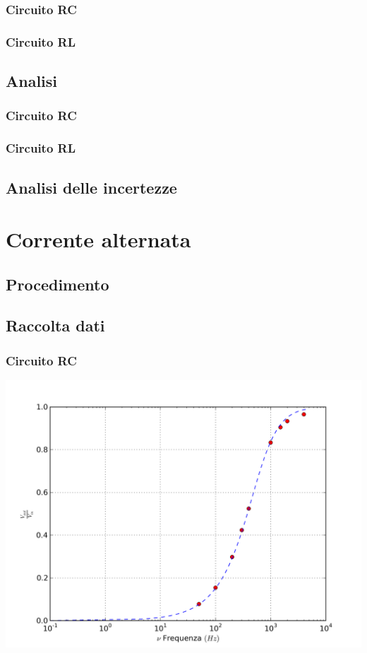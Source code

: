 \subsubsection{Circuito RC}

\subsubsection{Circuito RL}

\subsection{Analisi}

\subsubsection{Circuito RC}
\subsubsection{Circuito RL}
\subsection{Analisi delle incertezze}


\section{Corrente alternata}
\subsection{Procedimento}
\subsection{Raccolta dati}
\subsubsection{Circuito RC}
\begin{center}
 \includegraphics[scale=0.50]{grafici/C3/ddpcond.png}
\end{center}
